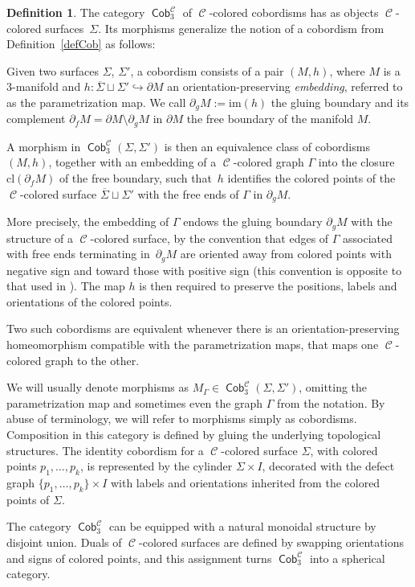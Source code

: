 \documentclass[pdftex]{sigma}
\DeclareMathOperator{\Cob}{\mathsf{Cob}}
\DeclareMathOperator{\calc}{\mathcal{C}}
\numberwithin{equation}{section}
\theoremstyle{definition}
\newtheorem{Definition}[Definition]{Definition}
\begin{document}
\begin{Definition}\label{defCobDef}
The category $\Cob_3^{\calc}$ of $\calc$-colored cobordisms has as objects $\calc$-colored surfaces~$\Sigma$. Its morphisms generalize the notion of a cobordism from Definition~\ref{defCob} as follows:

Given two surfaces $\Sigma$, $\Sigma'$, a cobordism consists of a pair $(M, h)$, where $M$ is a 3-manifold and $h\colon \overline{\Sigma} \sqcup \Sigma' \hookrightarrow \partial M$ an orientation-preserving \textit{embedding}, referred to as the parametrization map. We call $\partial_gM := \mathrm{im}(h)$ the gluing boundary and its complement $\partial_fM = \partial M \setminus \partial_gM$ in $\partial M$ the free boundary of the manifold $M$.

A morphism in $\Cob_3^{\calc}(\Sigma, \Sigma')$ is then an equivalence class of cobordisms $(M, h)$, together with an embedding of a $\calc$-colored graph $\Gamma$ into the closure $\mathrm{cl}(\partial _f M)$ of the free boundary, such that~$h$ identifies the colored points of the $\calc$-colored surface $\overline{\Sigma} \sqcup \Sigma'$ with the free ends of $\Gamma$ in $\partial_gM$.

More precisely, the embedding of $\Gamma$ endows the gluing boundary $\partial_gM$ with the structure of a $\calc$-colored surface, by the convention that edges of $\Gamma$ associated with free ends terminating in~$\partial_gM$ are oriented away from colored points with negative sign and toward those with positive sign (this convention is opposite to that used in \cite{F}). The map $h$ is then required to preserve the positions, labels and orientations of the colored points.

 Two such cobordisms are equivalent whenever there is an orientation-preserving homeomorphism compatible with the parametrization maps, that maps one $\calc$-colored graph to the other.

 We will usually denote morphisms as $M_{\Gamma} \in \Cob_3^{\calc}(\Sigma, \Sigma')$, omitting the parametrization map and sometimes even the graph $\Gamma$ from the notation. By abuse of terminology, we will refer to morphisms simply as cobordisms.
 Composition in this category is defined by gluing the underlying topological structures. The identity cobordism for a $\calc$-colored surface $\Sigma$, with colored points $p_1, \dots, p_k$, is represented by the cylinder $\Sigma \times I$, decorated with the defect graph $\{p_1, \dots, p_k\} \times I$ with labels and orientations inherited from the colored points of $\Sigma$.
\end{Definition}
The category $\Cob_3^{\calc}$ can be equipped with a natural monoidal structure by disjoint union. Duals of $\calc$-colored surfaces are defined by swapping orientations and signs of colored points, and this assignment turns $\Cob_3^{\calc}$ into a spherical category.
\end{document}
